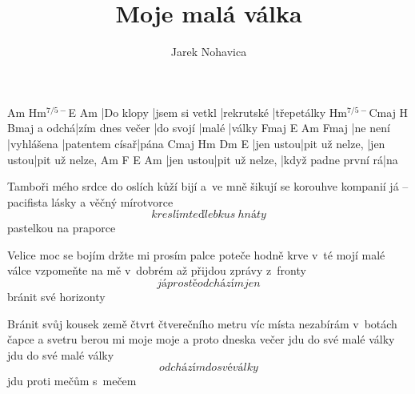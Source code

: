 \documentclass{song}
\author{Jarek Nohavica}
\title{Moje malá válka}
\newcommand{\Hmaug}{Hm$^{7/5-}$}
\begin{document}
\strophe
Am        \Hmaug         E\7        Am
|Do klopy |jsem si vetkl |rekrutské |třepetálky
       \Hmaug          Cmaj\7    H\7   Bmaj\7
a odchá|zím dnes večer |do svojí |malé |války
Fmaj\7   E\7        Am             Fmaj\7
|ne není |vyhlášena |patentem císař|pána
Cmaj\7    Hm\7           Dm\7      E\7
|jen ustou|pit už nelze, |jen ustou|pit už nelze,
Am        F\7            E\7                 Am
|jen ustou|pit už nelze, |když padne první rá|na
\endstrophe

\strophe*
Tamboři mého srdce do oslích kůží bijí
a~ve mně šikují se korouhve kompanií
já -- pacifista lásky a věčný mírotvorce
\[ kreslím teď lebku s~hnáty \] pastelkou na praporce
\endstrophe

\strophe*
Velice moc se bojím držte mi prosím palce
poteče hodně krve v~té mojí malé válce
vzpomeňte na mě v~dobrém až přijdou zprávy z~fronty
\[ já prostě odcházím jen \] bránit své horizonty
\endstrophe

\strophe*
Bránit svůj kousek země čtvrt čtverečního metru
víc místa nezabírám v~botách čapce a svetru
berou mi moje moje a proto dneska večer
jdu do své malé války jdu do své malé války
\[ odcházím do své války \] jdu proti mečům s~mečem
\endstrophe

\end{document}
